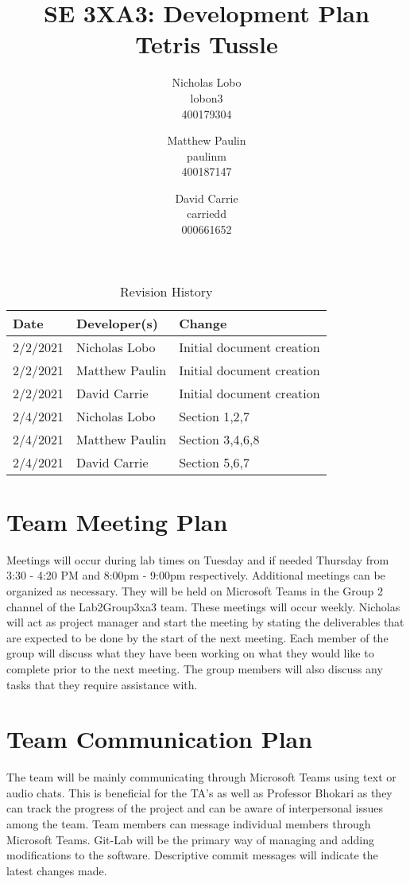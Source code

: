 \documentclass{article}
\title{SE 3XA3: Development Plan\\Tetris Tussle}
\author{Nicholas Lobo \\ lobon3 \\ 400179304 \and
		Matthew Paulin \\ paulinm \\ 400187147 \and
		David Carrie \\ carriedd \\ 000661652 \and
}
\date{}
\begin{document}
\begin{table}[hp]
\caption{Revision History} \label{TblRevisionHistory}
\begin{tabularx}{\textwidth}{llX}
\toprule
\textbf{Date} & \textbf{Developer(s)} & \textbf{Change}\\
\midrule
2/2/2021 & Nicholas Lobo & Initial document creation\\
2/2/2021 & Matthew Paulin & Initial document creation\\
2/2/2021 & David Carrie & Initial document creation\\
2/4/2021 & Nicholas Lobo & Section 1,2,7\\
2/4/2021 & Matthew Paulin & Section 3,4,6,8\\
2/4/2021 & David Carrie & Section 5,6,7\\
\bottomrule \end{tabularx} \end{table}

\newpage

\maketitle


\section{Team Meeting Plan}
Meetings will occur during lab times on Tuesday and if needed Thursday from 3:30 - 4:20 PM and 8:00pm - 9:00pm respectively. Additional meetings can be organized as necessary. They will be held on Microsoft Teams in the Group 2 channel of the  Lab2Group3xa3 team. These meetings will occur weekly. Nicholas will act as project manager and start the meeting by stating the deliverables that are expected to be done by the start of the next meeting. Each member of the group will discuss what they have been working on what they would like to complete prior to the next meeting. The group members will also discuss any tasks that they require assistance with.

\section{Team Communication Plan}
The team will be mainly communicating through Microsoft Teams using text or audio chats. This is beneficial for the TA's as well as Professor Bhokari as they can track the progress of the project and can be aware of interpersonal issues among the team. Team members can message individual members through Microsoft Teams. Git-Lab will be the primary way of managing and adding modifications to the software. Descriptive commit messages will indicate the latest changes made.
\end{document}
